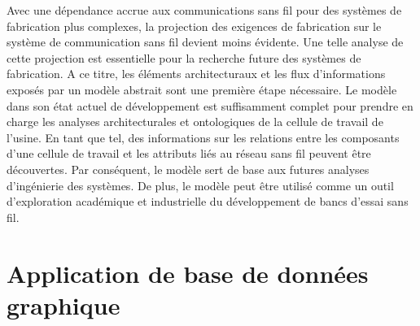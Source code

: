 \documentclass[12pt]{article}
\begin{document}
%

Avec une dépendance accrue aux communications sans fil pour des systèmes de fabrication plus complexes, la projection des exigences de fabrication sur le système de communication sans fil devient moins évidente. Une telle analyse de cette projection est essentielle pour la recherche future des systèmes de fabrication. A ce titre, les éléments architecturaux et les flux d'informations exposés par un modèle abstrait
sont une première étape nécessaire. Le modèle dans son état actuel de développement est suffisamment complet pour prendre en charge les analyses architecturales et ontologiques de la cellule de travail de l'usine. En tant que tel, des informations sur les relations entre les composants d'une cellule de travail et les attributs liés au réseau sans fil peuvent être découvertes. Par conséquent, le modèle sert de base aux futures analyses d'ingénierie des systèmes. De plus, le modèle peut être utilisé comme un outil d'exploration académique et industrielle du développement de bancs d'essai sans fil.  

\section*{Application de base de données graphique}
\end{document}
